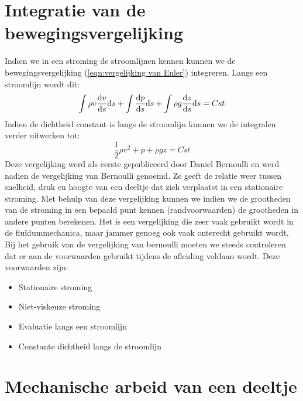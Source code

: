 	\section{Integratie van de bewegingsvergelijking}
	\label{sec:Integratie van de bewegingsvergelijking}
Indien we in een stroming de stroomlijnen kennen kunnen we de bewegingsvergelijking (\ref{eqn:vergelijking van Euler}) integreren. Langs een stroomlijn wordt dit:
\begin{equation}
	\int \rho v \frac{\mathrm{d} v}{\mathrm{d} s} \mathrm{d} s + \int \frac{\mathrm{d} p}{\mathrm{d} s} \mathrm{d} s + \int \rho g \frac{\mathrm{d} z}{\mathrm{d} s}  \mathrm{d} s = Cst
\end{equation}
Indien de dichtheid constant is langs de stroomlijn kunnen we de integralen verder uitwerken tot:
\begin{equation}
	\frac{1}{2} \rho v^2 + p + \rho g z = Cst
	\label{eqn:vergelijking van Bernoulli}
\end{equation}
Deze vergelijking werd als eerste gepubliceerd door Daniel Bernoulli en werd nadien de vergelijking van Bernoulli genoemd. Ze geeft de relatie weer tussen snelheid, druk en hoogte van een deeltje dat zich verplaatst in een stationaire stroming. Met behulp van deze vergelijking kunnen we indien we de grootheden van de stroming in een bepaald punt kennen (randvoorwaarden) de grootheden in andere punten berekenen. Het is een vergelijking die zeer vaak gebruikt wordt in de fluïdummechanica, maar jammer genoeg ook vaak onterecht gebruikt wordt. Bij het gebruik van de vergelijking van bernoulli moeten we steeds controleren dat er aan de voorwaarden gebruikt tijdens de afleiding voldaan wordt. Deze voorwaarden zijn:
\begin{itemize}
	\item Stationaire stroming
	\item Niet-viskeuze stroming
	\item Evaluatie langs een stroomlijn
	\item Constante dichtheid langs de stroomlijn
\end{itemize}
	
	\section{Mechanische arbeid van een deeltje}
	\label{sec:Mechanische arbeid van een deeltje}

